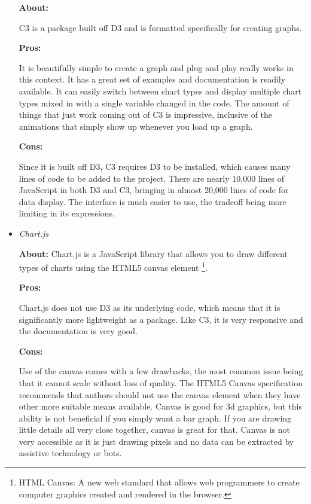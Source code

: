 \documentclass[draftclsnofoot,onecolumn,letterpaper,10pt]{IEEEtran}
\begin{document}
\begin{itemize}
			\textbf{About:}

			C3 is a package built off D3 and is formatted specifically for creating graphs.

			\noindent \textbf{Pros:}

			It is beautifully simple to create a graph and plug and play really works in this context.
			It has a great set of examples and documentation is readily available.
			It can easily switch between chart types and display multiple chart types mixed in with a single variable changed in the code.\cite{c3.org}
			The amount of things that just work coming out of C3 is impressive, inclusive of the animations that simply show up whenever you load up a graph.

			\noindent \textbf{Cons:}

			Since it is built off D3, C3 requires D3 to be installed, which causes many lines of code to be added to the project.
			There are nearly 10,000 lines of JavaScript in both D3 and C3, bringing in almost 20,000 lines of code for data display.
			The interface is much easier to use, the tradeoff being more limiting in its expressions.


		\item{\textit{Chart.js}}


			\textbf{About:}
			Chart.js is a JavaScript library that allows you to draw different types of charts using the HTML5 canvas element
			\footnote{HTML Canvas: A new web standard that allows web programmers to create computer graphics created and rendered in the browser.}.

			\noindent \textbf{Pros:}

			Chart.js does not use D3 as its underlying code, which means that it is significantly more lightweight as a package.\cite{ChartJS} Like C3, it is very responsive and the documentation is very good.

			\noindent \textbf{Cons:}

			Use of the canvas comes with a few drawbacks, the most common issue being that it cannot scale without loss of quality.
			The HTML5 Canvas specification recommends that authors should not use the canvas element when they have other more suitable means available.\cite{CanvasVsSVG}
			Canvas is good for 3d graphics, but this ability is not beneficial if you simply want a bar graph.
			If you are drawing little details all very close together, canvas is great for that.
			Canvas is not very accessible as it is just drawing pixels and no data can be extracted by assistive technology or bots.

	\end{itemize}
\end{document}
